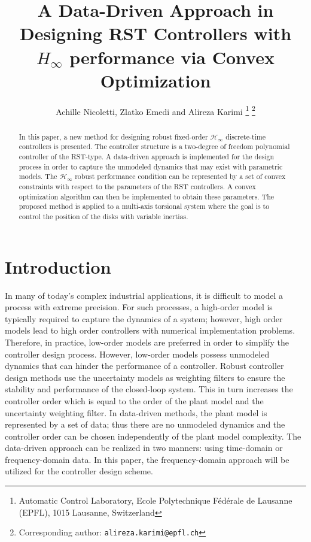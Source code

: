 \documentclass[a4paper, 10pt, conference]{ieeeconf}
\title{\LARGE \bf A Data-Driven Approach in Designing RST Controllers with $H_{\infty}$ performance via Convex Optimization}
\author{Achille Nicoletti, Zlatko Emedi and Alireza Karimi %
\thanks{Automatic Control Laboratory,
Ecole Polytechnique F\'{e}d\'{e}rale de Lausanne (EPFL),
1015 Lausanne, Switzerland}%
\thanks{Corresponding author: {\tt\small alireza.karimi@epfl.ch}}%
}
\begin{document}
\maketitle
\thispagestyle{empty}
\pagestyle{empty}

\begin{abstract}
In this paper, a new method for designing robust fixed-order $\mathcal{H}_{\infty}$ discrete-time controllers is presented. The controller structure is a two-degree of freedom polynomial controller of the RST-type. A data-driven approach is implemented for the design process in order to capture the unmodeled dynamics that may exist with parametric models. The $\mathcal{H}_{\infty}$ robust performance condition can be represented by a set of convex constraints with respect to the parameters of the RST controllers. A convex optimization algorithm can then be implemented to obtain these parameters. The proposed method is applied to a multi-axis torsional system where the goal is to control the position of the disks with variable inertias.
\end{abstract}


\section{Introduction}
In many of today's complex industrial applications, it is difficult to model a process with extreme precision. For such processes, a high-order model is typically required to capture the dynamics of a system; however, high order models lead to high order controllers with numerical implementation problems.  Therefore, in practice, low-order models are preferred in order to simplify the controller design process. However, low-order models possess unmodeled dynamics that can hinder the performance of a controller. Robust controller design methods use the uncertainty models as weighting filters to ensure the stability and performance of the closed-loop system. This in turn increases the controller order which is equal to the order of the plant model and the uncertainty weighting filter. In data-driven methods, the plant model is represented by a set of data; thus there are no unmodeled dynamics and the controller order can be chosen independently of the plant model complexity.  The data-driven approach can be realized in two manners: using time-domain or frequency-domain data. In this paper, the frequency-domain approach will be utilized for the controller design scheme.
\end{document}
